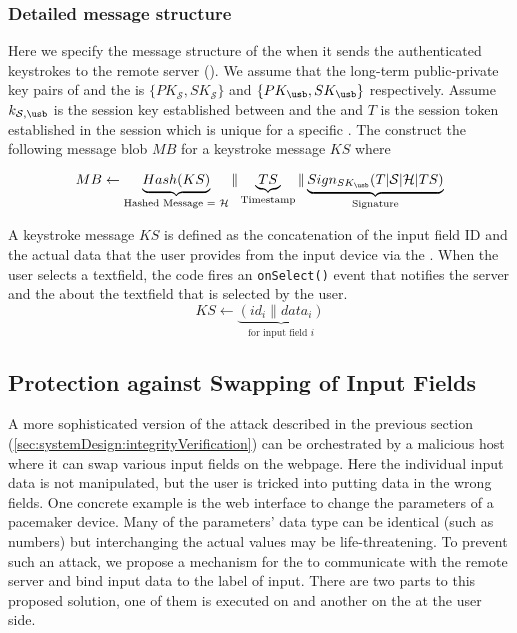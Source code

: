 \subsubsection{Detailed message structure}

Here we specify the message structure of the \device when it sends the authenticated keystrokes to the remote server (\server). We assume that the long-term public-private key pairs of \server and the \device is $\{PK_\mathcal{S}, SK_\mathcal{S}\}$ and $\{PK_\usb, SK_\usb\}$ respectively. Assume $k_{\mathcal{S}, \usb}$ is the session key established between \server and the \device and $T$ is the session token established in the \tls session which is unique for a specific \device. The \device construct the following message blob $MB$ for a keystroke message $KS$ where

\[
  MB \leftarrow 
    \underbrace{Hash (KS)}_{\text{Hashed Message = $\mathcal{H}$}} \| 
    \underbrace{TS}_\text{Timestamp} \|
    \underbrace{Sign_{SK_\usb}(T| \mathcal{S}| \mathcal{H} | TS)}_\text{Signature}
\]

A keystroke message $KS$ is defined as the concatenation of the input field ID and the actual data that the user provides from the input device via the \device.  When the user selects a textfield, the \js code fires an \texttt{onSelect()} event that notifies the server and the \device about the textfield that is selected by the user.
\[
    KS \leftarrow  \underbrace{(id_i\|data_i)}_{\text{for input field $i$}}
\]

 
\subsection{Protection against Swapping of Input Fields}
\label{sec:secureChannel:swappingFields}

A more sophisticated version of the attack described in the previous section (\ref{sec:systemDesign:integrityVerification}) can be orchestrated by a malicious host where it can swap various input fields on the webpage. Here the individual input data is not manipulated, but the user is tricked into putting data in the wrong fields. One concrete example is the web interface to change the parameters of a pacemaker device. Many of the parameters' data type can be identical (such as numbers) but interchanging the actual values may be life-threatening. To prevent such an attack, we propose a mechanism for the \device to communicate with the remote server and bind input data to the label of input. There are two parts to this proposed solution, one of them is executed on \server and another on the \device at the user side.

